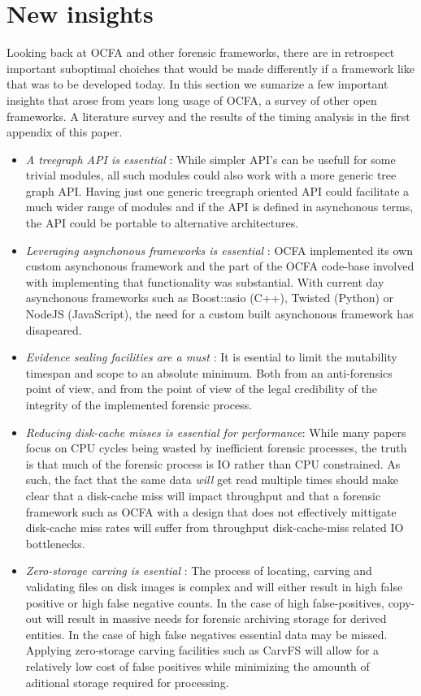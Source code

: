 \section{New insights}
Looking back at OCFA and other forensic frameworks, there are in retrospect important suboptimal choiches that would be made differently if a framework like that was to be developed today. In this section we sumarize a few important insights that arose from years long usage of OCFA, a survey of other open frameworks. A literature survey and the results of the timing analysis in the first appendix of this paper.
\begin{itemize}
\item \emph{A treegraph API is essential} : While simpler API's can be usefull for some trivial modules, all such modules could also work with a more generic tree graph API. Having just one generic treegraph oriented API could facilitate a much wider range of modules and if the API is defined in asynchonous terms, the API could be portable to alternative architectures.
\item \emph{Leveraging asynchonous frameworks is essential} : OCFA implemented its own custom asynchonous framework and the part of the OCFA code-base involved with implementing that functionality was substantial. With current day asynchonous frameworks such as Boost::asio (C++), Twisted (Python) or NodeJS (JavaScript), the need for a custom built asynchonous framework has disapeared.
\item \emph{Evidence sealing facilities are a must} : It is esential to limit the mutability timespan and scope to an absolute minimum. Both from an anti-forensics point of view, and from the point of view of the legal credibility of the integrity of the implemented forensic process.
\item \emph{Reducing disk-cache misses is essential for performance}: While many papers focus on CPU cycles being wasted by inefficient forensic processes, the truth is that much of the forensic process is IO rather than CPU constrained. As such, the fact that the same data \emph{will} get read multiple times should make clear that a disk-cache miss will impact throughput and that a forensic framework such as OCFA with a design that does not effectively mittigate disk-cache miss rates will suffer from throughput disk-cache-miss related IO bottlenecks.
\item \emph{Zero-storage carving is esential} : The process of locating, carving and validating files on disk images is complex and will either result in high false positive or high false negative counts. In the case of high false-positives, copy-out will result in massive needs for forensic archiving storage for derived entities. In the case of high false negatives essential data may be missed. Applying zero-storage carving facilities such as CarvFS will allow for a relatively low cost of false positives while minimizing the amounth of aditional storage required for processing.

\end{itemize}
